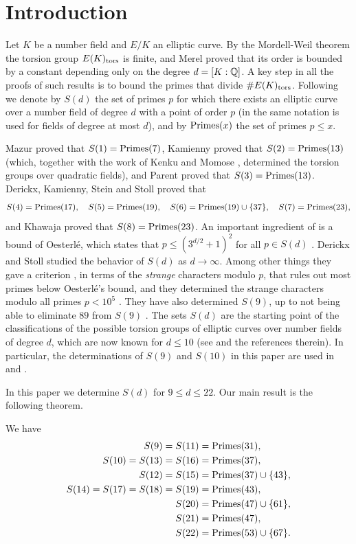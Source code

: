 \section{Introduction}

Let $K$ be a number field and $E/K$ an elliptic curve. By the Mordell-Weil theorem the torsion group $E(K)_{\mathrm{tors}}$ is finite, and Merel \cite{merel} proved that its order is bounded by a constant depending only on the degree $d=[K:\mathbb{Q}]$. A key step in all the proofs of such results is to bound the primes that divide $\#E(K)_{\mathrm{tors}}$. Following \cite[Definition 1.1]{DKSS} we denote by $S(d)$ the set of primes $p$ for which there exists an elliptic curve over a number field of degree $d$ with a point of order $p$ (in \cite{KamiennyMazur} the same notation is used for fields of degree at most $d$), and by $\mathrm{Primes}(x)$ the set of primes $p\leq x$.

Mazur \cite{mazur} proved that $S(1)=\mathrm{Primes}(7)$, Kamienny \cite{kamienny} proved that $S(2)=\mathrm{Primes}(13)$ (which, together with the work of Kenku and Momose \cite{KM}, determined the torsion groups over quadratic fields), and Parent \cite{parent,parent2003} proved that $S(3)=\mathrm{Primes}(13)$. Derickx, Kamienny, Stein and Stoll \cite[Theorem 1.2]{DKSS} proved that
$$S(4)=\mathrm{Primes}(17),\quad S(5)=\mathrm{Primes}(19),\quad S(6)=\mathrm{Primes}(19)\cup\{37\},\quad S(7)=\mathrm{Primes}(23),$$
and Khawaja \cite{khawaja} proved that $S(8)=\mathrm{Primes}(23)$. An important ingredient of \cite{DKSS} is a bound of Oesterl\'e, which states that $p\leq(3^{d/2}+1)^2$ for all $p\in S(d)$ \cite[Theorem 6.1]{DKSS}. Derickx and Stoll \cite{DSt} studied the behavior of $S(d)$ as $d\to\infty$. Among other things they gave a criterion \cite[Corollary 7.5]{DSt}, in terms of the \textit{strange} characters modulo $p$, that rules out most primes below Oesterl\'e's bound, and they determined the strange characters modulo all primes $p<10^5$ \cite[Proposition 5.2 and Table 2]{DSt}. They have also determined $S(9)$, up to not being able to eliminate $89$ from $S(9)$ \cite{DSt9}. The sets $S(d)$ are the starting point of the classifications of the possible torsion groups of elliptic curves over number fields of degree $d$, which are now known for $d\leq 10$ (see \cite{DEHMZ,DN,N5,N10,N69} and the references therein). In particular, the determinations of $S(9)$ and $S(10)$ in this paper are used in \cite{N69} and \cite{N10}.

In this paper we determine $S(d)$ for $9\leq d\leq 22$. Our main result is the following theorem.

\begin{theorem}\label{thm:main}
We have
\begin{align*}
S(9)=S(11)&=\mathrm{Primes}(31),\\
S(10)=S(13)=S(16)&=\mathrm{Primes}(37),\\
S(12)=S(15)&=\mathrm{Primes}(37)\cup\{43\},\\
S(14)=S(17)=S(18)=S(19)&=\mathrm{Primes}(43),\\
S(20)&=\mathrm{Primes}(47)\cup\{61\},\\
S(21)&=\mathrm{Primes}(47),\\
S(22)&=\mathrm{Primes}(53)\cup\{67\}.
\end{align*}
\end{theorem}

